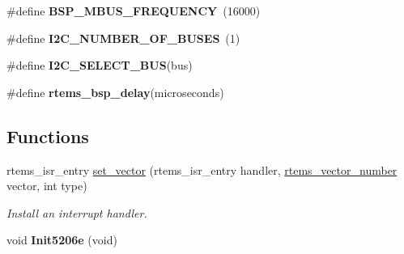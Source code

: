 \begin{DoxyCompactItemize}
\item 
\mbox{\label{group__RTEMSBSPsM68kMCF5206Elite_ga715cdea3fcaed0bdba2818a77852b337}} 
\#define {\bfseries B\+S\+P\+\_\+\+M\+B\+U\+S\+\_\+\+F\+R\+E\+Q\+U\+E\+N\+CY}~(16000)
\item 
\mbox{\label{group__RTEMSBSPsM68kMCF5206Elite_ga468650ed946efd6ab0b325e4dfb10fd3}} 
\#define {\bfseries I2\+C\+\_\+\+N\+U\+M\+B\+E\+R\+\_\+\+O\+F\+\_\+\+B\+U\+S\+ES}~(1)
\item 
\mbox{\label{group__RTEMSBSPsM68kMCF5206Elite_ga63d7c88a18f38fd12e296ef2c31f7fe7}} 
\#define {\bfseries I2\+C\+\_\+\+S\+E\+L\+E\+C\+T\+\_\+\+B\+US}(bus)
\item 
\#define {\bfseries rtems\+\_\+bsp\+\_\+delay}(microseconds)
\end{DoxyCompactItemize}
\subsection*{Functions}
\begin{DoxyCompactItemize}
\item 
rtems\+\_\+isr\+\_\+entry \mbox{\hyperlink{group__RTEMSBSPsM68kMCF5206Elite_gab3388042c56b34c40be81fd5f028d97e}{set\+\_\+vector}} (rtems\+\_\+isr\+\_\+entry handler, \mbox{\hyperlink{group__ClassicINTR_ga3e434c197d99f128e78cae4d9358bd8b}{rtems\+\_\+vector\+\_\+number}} vector, int type)
\begin{DoxyCompactList}\small\item\em Install an interrupt handler. \end{DoxyCompactList}\item 
\mbox{\label{group__RTEMSBSPsM68kMCF5206Elite_ga343e845aeefde07cc532ffdf2d70cf0a}} 
void {\bfseries Init5206e} (void)
\end{DoxyCompactItemize}
